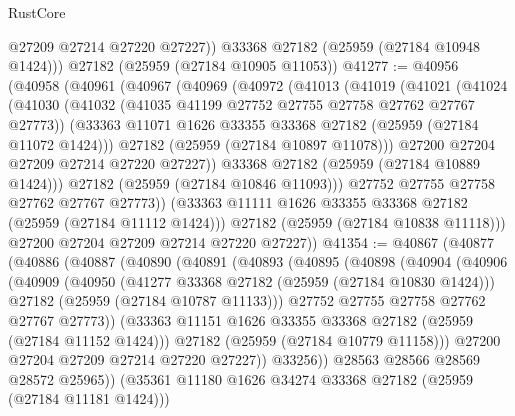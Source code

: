 \begin{lexlean}{RustCore}
\begin{coremodule}
          @27209
          @27214
          @27220
          @27227))
      @33368
      @27182
      (@25959 (@27184 @10948 @1424)))
    @27182
    (@25959 (@27184 @10905 @11053))
@41277 := @40956
    (@40958
      (@40961
        (@40967
          (@40969
            (@40972
              (@41013
                (@41019
                  (@41021
                    (@41024
                      (@41030
                        (@41032 (@41035 @41199 @27752 @27755 @27758 @27762 @27767 @27773))
                        (@33363 @11071 @1626 @33355 @33368 @27182 (@25959 (@27184 @11072 @1424)))
                        @27182
                        (@25959 (@27184 @10897 @11078)))
                      @27200
                      @27204
                      @27209
                      @27214
                      @27220
                      @27227))
                  @33368
                  @27182
                  (@25959 (@27184 @10889 @1424)))
                @27182
                (@25959 (@27184 @10846 @11093)))
              @27752
              @27755
              @27758
              @27762
              @27767
              @27773))
          (@33363 @11111 @1626 @33355 @33368 @27182 (@25959 (@27184 @11112 @1424)))
          @27182
          (@25959 (@27184 @10838 @11118)))
        @27200
        @27204
        @27209
        @27214
        @27220
        @27227))
@41354 := @40867
    (@40877
      (@40886
        (@40887
          (@40890
            (@40891
              (@40893
                (@40895
                  (@40898
                    (@40904
                      (@40906
                        (@40909
                          (@40950
                            (@41277 @33368 @27182 (@25959 (@27184 @10830 @1424)))
                            @27182
                            (@25959 (@27184 @10787 @11133)))
                          @27752
                          @27755
                          @27758
                          @27762
                          @27767
                          @27773))
                      (@33363 @11151 @1626 @33355 @33368 @27182 (@25959 (@27184 @11152 @1424)))
                      @27182
                      (@25959 (@27184 @10779 @11158)))
                    @27200
                    @27204
                    @27209
                    @27214
                    @27220
                    @27227))
                @33256))
            @28563
            @28566
            @28569
            @28572
            @25965))
        (@35361 @11180 @1626 @34274 @33368 @27182 (@25959 (@27184 @11181 @1424)))

\end{coremodule}
\end{lexlean}
